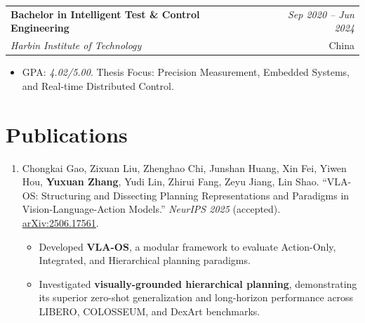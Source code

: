 \documentclass[11pt]{article}
\makeatletter
\newenvironment{cvitems}{%
  \setlength{\parskip}{0pt}%
\begin{itemize}[leftmargin=*, itemsep=0.1em, topsep=0em, partopsep=0em, parsep=0pt]}{
  \end{itemize}}
\newcommand{\cventry}[4]{%
  \noindent
  \begin{tabular*}{\textwidth}{@{}p{0.75\textwidth}@{\extracolsep{\fill}}r@{}}
    \textbf{#1} & \textit{#4} \\
    \textit{#2} & #3 \\
  \end{tabular*}
  \vspace{-0.4em}
}
\makeatother
\begin{document}
\cventry{Bachelor in Intelligent Test \& Control Engineering}{Harbin Institute of Technology}{China}{Sep 2020 -- Jun 2024}
\begin{cvitems}
\item GPA: \textit{4.02/5.00}. Thesis Focus: Precision Measurement, Embedded Systems, and Real-time Distributed Control.
\end{cvitems}

\section{Publications}
\begin{enumerate}[leftmargin=*, itemsep=0.25em, topsep=0.2em]
  \item Chongkai Gao, Zixuan Liu, Zhenghao Chi, Junshan Huang, Xin Fei, Yiwen Hou, \textbf{Yuxuan Zhang}, Yudi Lin, Zhirui Fang, Zeyu Jiang, Lin Shao. ``VLA-OS: Structuring and Dissecting Planning Representations and Paradigms in Vision-Language-Action Models.'' \textit{NeurIPS 2025} (accepted). \href{https://arxiv.org/abs/2506.17561}{arXiv:2506.17561}.
    \begin{cvitems}
    \item Developed \textbf{VLA-OS}, a modular framework to evaluate Action-Only, Integrated, and Hierarchical planning paradigms.
    \item Investigated \textbf{visually-grounded hierarchical planning}, demonstrating its superior zero-shot generalization and long-horizon performance across LIBERO, COLOSSEUM, and DexArt benchmarks.
    \end{cvitems}
\end{enumerate}

\end{document}

